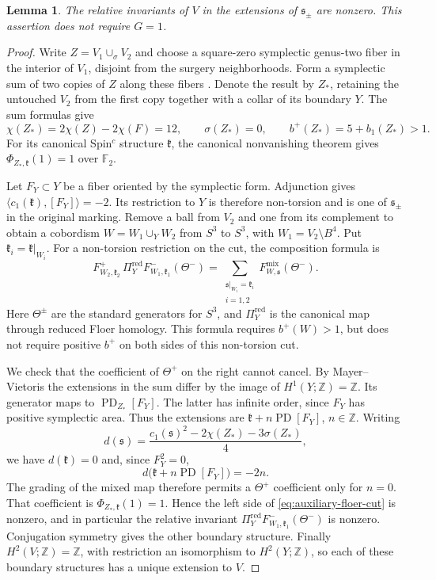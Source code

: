 \documentclass[11pt]{amsart}
\newtheorem{lemma}[theorem]{Lemma}
\theoremstyle{definition}
\theoremstyle{remark}
\newcommand{\Z}{\mathbb Z}
\newcommand{\Ftwo}{\mathbb F_2}
\begin{document}
\begin{lemma}\label{lem:relative-nonvanishing}
The relative invariants of $V$ in the extensions of
$\mathfrak s_\pm$ are nonzero. This assertion does not require $G=1$.
\end{lemma}
\begin{proof}
Write $Z=V_1\cup_\sigma V_2$ and choose a square-zero symplectic
genus-two fiber in the interior of $V_1$, disjoint from the surgery
neighborhoods. Form a symplectic sum of two copies of $Z$ along
these fibers \cite{Gom95}. Denote the result by $Z_*$, retaining
the untouched $V_2$ from the first copy together with a collar of
its boundary $Y$. The sum formulas give
\[
 \chi(Z_*)=2\chi(Z)-2\chi(F)=12,\qquad
 \sigma(Z_*)=0,\qquad b^+(Z_*)=5+b_1(Z_*)>1.
\]
For its canonical Spin$^c$ structure $\mathfrak k$, the canonical
nonvanishing theorem \cite[Theorem 1.1]{OS04} gives
$\Phi_{Z_*,\mathfrak k}(1)=1$ over $\Ftwo$.

Let $F_Y\subset Y$ be a fiber oriented by the symplectic form.
Adjunction gives $\langle c_1(\mathfrak k),[F_Y]\rangle=-2$.
Its restriction to $Y$ is therefore non-torsion and is one of
$\mathfrak s_\pm$ in the original marking. Remove a ball from
$V_2$ and one from its complement to obtain a cobordism
$W=W_1\cup_Y W_2$ from $S^3$ to $S^3$, with
$W_1=V_2\setminus B^4$. Put $\mathfrak k_i=\mathfrak k|_{W_i}$.
For a non-torsion restriction on the cut,
the composition formula \cite[Section 2]{OS04} is
\begin{equation}\label{eq:auxiliary-floer-cut}
 F^+_{W_2,\mathfrak k_2}\,\Pi_Y^{\mathrm{red}}
 F^-_{W_1,\mathfrak k_1}(\Theta^-)
 =\sum_{\substack{\mathfrak s|_{W_i}=\mathfrak k_i\\i=1,2}}
                  F^{\mathrm{mix}}_{W,\mathfrak s}(\Theta^-).
\end{equation}
Here $\Theta^\pm$ are the standard generators for $S^3$, and
$\Pi_Y^{\mathrm{red}}$ is the canonical map through reduced Floer
homology. This formula requires $b^+(W)>1$, but does not require
positive $b^+$ on both sides of this non-torsion cut.

We check that the coefficient of $\Theta^+$ on the right cannot
cancel. By Mayer--Vietoris the extensions in the sum differ by
the image of $H^1(Y;\Z)=\Z$. Its generator maps to
$\operatorname{PD}_{Z_*}[F_Y]$. The latter has infinite order,
since $F_Y$ has positive symplectic area. Thus the extensions are
$\mathfrak k+n\operatorname{PD}[F_Y]$, $n\in\Z$.
Writing
\[
 d(\mathfrak s)=
 \frac{c_1(\mathfrak s)^2-2\chi(Z_*)-3\sigma(Z_*)}{4},
\]
we have $d(\mathfrak k)=0$ and, since $F_Y^2=0$,
\[
 d\bigl(\mathfrak k+n\operatorname{PD}[F_Y]\bigr)=-2n.
\]
The grading of the mixed map therefore permits a $\Theta^+$
coefficient only for $n=0$. That coefficient is
$\Phi_{Z_*,\mathfrak k}(1)=1$. Hence the left side of
\eqref{eq:auxiliary-floer-cut} is nonzero, and in particular the
relative invariant
$\Pi_Y^{\mathrm{red}}F^-_{W_1,\mathfrak k_1}(\Theta^-)$
is nonzero. Conjugation symmetry \cite[Theorem 3.6]{OS06} gives
the other boundary structure. Finally $H^2(V;\Z)=\Z$, with
restriction an isomorphism to $H^2(Y;\Z)$, so each of these
boundary structures has a unique extension to $V$.
\end{proof}
\end{document}
